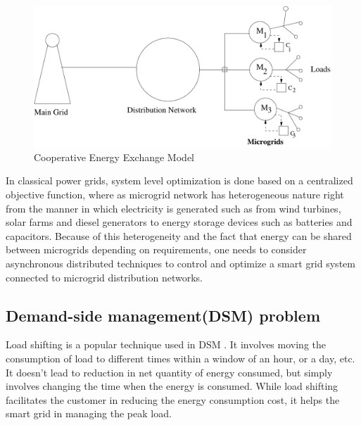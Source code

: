 \begin{figure}[thpb]
      \centering
      \includegraphics[scale=0.4]{powergrid2.pdf}
      \caption{Cooperative Energy Exchange Model}
      \label{gridmodel}
\end{figure}

In classical power grids, system level optimization is done based on a centralized objective function, where as microgrid network has heterogeneous nature right from the manner in which electricity is generated such as from wind turbines, solar farms and diesel generators to energy storage devices such as batteries and capacitors. Because of this heterogeneity and the fact that energy can be shared between microgrids depending on requirements, one needs to consider asynchronous distributed techniques 
to control and optimize a smart grid system connected to microgrid distribution networks.

\subsection{Demand-side management(DSM) problem}
 Load shifting is a popular technique used in DSM \cite{DTU2010}. It involves moving the consumption of load to different times within a window of an hour, or a day, etc. It doesn't lead to reduction in net quantity of energy consumed, but simply involves changing the time when the energy is consumed. While load shifting facilitates the customer in reducing the energy consumption cost, it helps the smart grid in managing the peak load.

